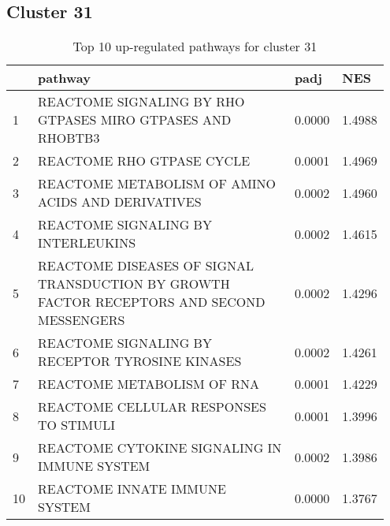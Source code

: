\documentclass{article}
\begin{document}
\subsection{Cluster 31 }
\begin{table}[H]
\centering
\begin{tabular}{p{0.05\linewidth}p{0.7\linewidth}p{0.1\linewidth}p{0.1\linewidth}}
  \hline
 & pathway & padj & NES \\ 
  \hline
1 & REACTOME SIGNALING BY RHO GTPASES MIRO GTPASES AND RHOBTB3 & 0.0000 & 1.4988 \\ 
  2 & REACTOME RHO GTPASE CYCLE & 0.0001 & 1.4969 \\ 
  3 & REACTOME METABOLISM OF AMINO ACIDS AND DERIVATIVES & 0.0002 & 1.4960 \\ 
  4 & REACTOME SIGNALING BY INTERLEUKINS & 0.0002 & 1.4615 \\ 
  5 & REACTOME DISEASES OF SIGNAL TRANSDUCTION BY GROWTH FACTOR RECEPTORS AND SECOND MESSENGERS & 0.0002 & 1.4296 \\ 
  6 & REACTOME SIGNALING BY RECEPTOR TYROSINE KINASES & 0.0002 & 1.4261 \\ 
  7 & REACTOME METABOLISM OF RNA & 0.0001 & 1.4229 \\ 
  8 & REACTOME CELLULAR RESPONSES TO STIMULI & 0.0001 & 1.3996 \\ 
  9 & REACTOME CYTOKINE SIGNALING IN IMMUNE SYSTEM & 0.0002 & 1.3986 \\ 
  10 & REACTOME INNATE IMMUNE SYSTEM & 0.0000 & 1.3767 \\ 
   \hline
\end{tabular}
\caption{Top 10 up-regulated pathways for cluster 31} 
\label{tab:q3_2_31}
\end{table}
\end{document}
